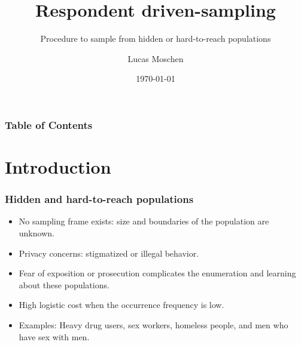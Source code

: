 \documentclass{beamer}
\title[Respondent driven-sampling]
{Respondent driven-sampling}
\subtitle{Procedure to sample from hidden or hard-to-reach populations}
\author[Lucas Moschen]
{Lucas Moschen}
\institute[EMAp/FGV]
{
  School of Applied Mathematics\\
  Fundação Getulio Vargas
}
\date[\today]
{\today}
\begin{document}
\frame{\titlepage}

\begin{frame}
\frametitle{Table of Contents}
\tableofcontents
\end{frame}

\section{Introduction}

\begin{frame}
\frametitle{Hidden and hard-to-reach populations}

\begin{itemize}
    \justifying
    \item No sampling frame exists: size and boundaries of the population are unknown.
    \item Privacy concerns: stigmatized or illegal behavior. 
    \item Fear of exposition or prosecution complicates the enumeration and learning about these populations.
    \item High logistic cost when the occurrence frequency is low.
    \item Examples: Heavy drug users, sex workers, homeless people, and men who have sex
    with men. 
\end{itemize}

\end{frame}
\end{document}
